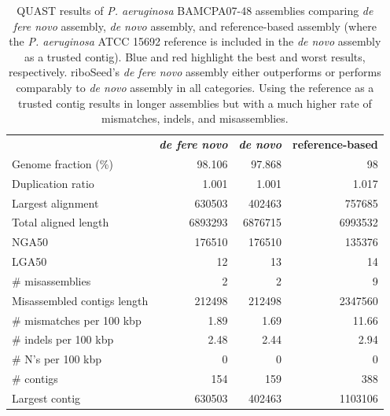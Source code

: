 \documentclass[10pt]{article}
\begin{document}
\begin{table}[]
\centering
\caption{QUAST\cite{Gurevich2013} results of \textit{P. aeruginosa} BAMCPA07-48 assemblies comparing \textit{de fere novo} assembly, \textit{de novo} assembly, and reference-based assembly (where the \textit{P. aeruginosa} ATCC 15692 reference is included in the \textit{de novo} assembly as a trusted contig).  Blue and red highlight the best and worst results, respectively.  riboSeed's \textit{de fere novo} assembly either outperforms or performs comparably to \textit{de novo} assembly in all categories.  Using the reference as a trusted contig results in longer assemblies but with a much higher rate of mismatches, indels, and misassemblies.}
\label{table:full_ref_compare}
\begin{tabular}{lrrr}
  & \textbf{\textit{de fere novo}} & \textbf{\textit{de novo}} & \textbf{reference-based} \\
Genome fraction (\%) & \cellcolor[HTML]{CDCDF9}98.106 & \cellcolor[HTML]{FBDADA}97.868 & 98 \\
Duplication ratio & 1.001 & 1.001 & \cellcolor[HTML]{FBDADA}1.017 \\
Largest alignment & 630503 & \cellcolor[HTML]{FBDADA}402463 & \cellcolor[HTML]{CDCDF9}757685 \\
Total aligned length & 6893293 & \cellcolor[HTML]{FBDADA}6876715 & \cellcolor[HTML]{CDCDF9}6993532 \\
NGA50 & 176510 & 176510 & \cellcolor[HTML]{FBDADA}135376 \\
LGA50 & \cellcolor[HTML]{CDCDF9}12 & 13 & \cellcolor[HTML]{FBDADA}14 \\
\# misassemblies & 2 & 2 & \cellcolor[HTML]{FBDADA}9 \\
Misassembled contigs length & 212498 & 212498 & \cellcolor[HTML]{FBDADA}2347560 \\
\# mismatches per 100 kbp & 1.89 & \cellcolor[HTML]{CDCDF9}1.69 & \cellcolor[HTML]{FBDADA}11.66 \\
\# indels per 100 kbp & 2.48 & \cellcolor[HTML]{CDCDF9}2.44 & \cellcolor[HTML]{FBDADA}2.94 \\
\# N's per 100 kbp & 0 & 0 & 0 \\
\# contigs & \cellcolor[HTML]{CDCDF9}154 & 159 & 388 \\
Largest contig & 630503 & \cellcolor[HTML]{FBDADA}402463 & \cellcolor[HTML]{CDCDF9}1103106 \\

\end{tabular}
\end{table}
\end{document}
